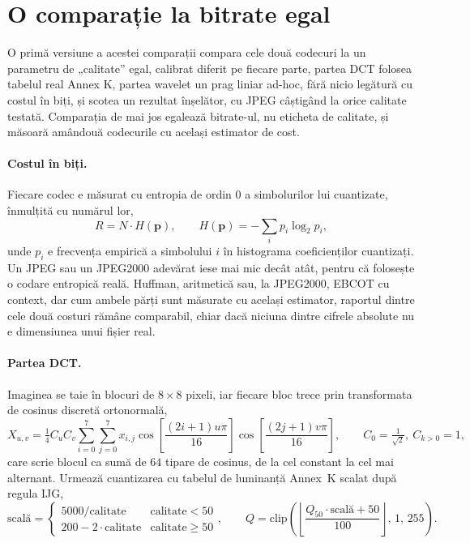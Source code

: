 \section{O comparație la bitrate egal}
\label{sec:comparatie}

O primă versiune a acestei comparații compara cele două codecuri la un
parametru de „calitate” egal, calibrat diferit pe fiecare parte, partea DCT
folosea tabelul real Annex K, partea wavelet un prag liniar ad-hoc, fără
nicio legătură cu costul în biți, și scotea un rezultat înșelător, cu JPEG
câștigând la orice calitate testată. Comparația de mai jos egalează
bitrate-ul, nu eticheta de calitate, și măsoară amândouă codecurile cu
același estimator de cost.

\paragraph{Costul în biți.} Fiecare codec e măsurat cu entropia de ordin 0 a
simbolurilor lui cuantizate, înmulțită cu numărul lor,
\[
R = N \cdot H(\mathbf{p}), \qquad H(\mathbf{p}) = -\sum_i p_i \log_2 p_i,
\]
unde $p_i$ e frecvența empirică a simbolului $i$ în histograma
coeficienților cuantizați. Un JPEG sau un JPEG2000 adevărat iese mai mic
decât atât, pentru că folosește o codare entropică reală. Huffman,
aritmetică sau, la JPEG2000, EBCOT cu context, dar cum ambele părți sunt
măsurate cu același estimator, raportul dintre cele două costuri rămâne
comparabil, chiar dacă niciuna dintre cifrele absolute nu e dimensiunea unui
fișier real.

\paragraph{Partea DCT.} Imaginea se taie în blocuri de $8\times 8$ pixeli, iar
fiecare bloc trece prin transformata de cosinus discretă ortonormală,
\[
X_{u,v} = \tfrac14 C_u C_v \sum_{i=0}^{7}\sum_{j=0}^{7} x_{i,j}
  \cos\!\left[\frac{(2i+1)u\pi}{16}\right]
  \cos\!\left[\frac{(2j+1)v\pi}{16}\right], \qquad
C_0 = \tfrac{1}{\sqrt2},\ C_{k>0} = 1,
\]
care scrie blocul ca sumă de $64$ tipare de cosinus, de la cel constant la
cel mai alternant. Urmează cuantizarea cu tabelul de luminanță Annex~K
scalat după regula IJG,
\[
\text{scală} = \begin{cases} 5000/\text{calitate} & \text{calitate} < 50 \\ 200 - 2\cdot\text{calitate} & \text{calitate}\ge 50 \end{cases}, \qquad
Q = \mathrm{clip}\!\left(\left\lfloor \frac{Q_{50}\cdot\text{scală}+50}{100}\right\rfloor,\, 1,\, 255\right).
\]

